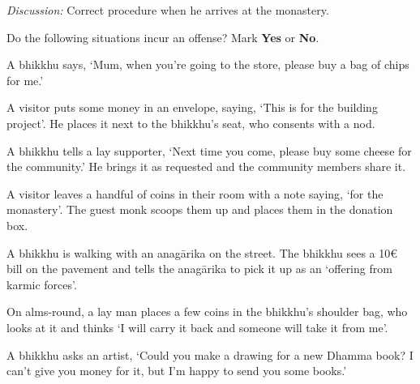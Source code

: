 \begin{exam}{\autoExamName}
    \emph{Discussion:} Correct procedure when he arrives at the monastery.

  \problemDivide

  \begin{problem*}

    Do the following situations incur an offense? Mark \textbf{Yes} or \textbf{No}.

    \bigskip

    \begin{parts}

    \item {} A bhikkhu says, `Mum, when you're going to the store, please
    buy a bag of chips for me.'

    \bigskip

    \item {} A visitor puts some money in an envelope, saying, `This is for
      the building project'. He places it next to the bhikkhu's seat, who
      consents with a nod.

    \bigskip

    \item {} A bhikkhu tells a lay supporter, `Next time you come, please
      buy some cheese for the community.' He brings it as requested and the
      community members share it.

    \bigskip

    \item {} A visitor leaves a handful of coins in their room with a note saying, `for the monastery'.
      The guest monk scoops them up and places them in the donation box.

    \bigskip

    \item {} A bhikkhu is walking with an anagārika on the street. The
      bhikkhu sees a 10€ bill on the pavement and tells the anagārika to pick it
      up as an `offering from karmic forces'.

    \bigskip

    \item {} On alms-round, a lay man places a few coins in the bhikkhu's
      shoulder bag, who looks at it and thinks `I will carry it back and someone
      will take it from me'.

    \bigskip

    \item {} A bhikkhu asks an artist, `Could you make a drawing for a new
      Dhamma book? I can't give you money for it, but I'm happy to send you some
      books.'

    \end{parts}
    
  \end{problem*}

\end{exam}
